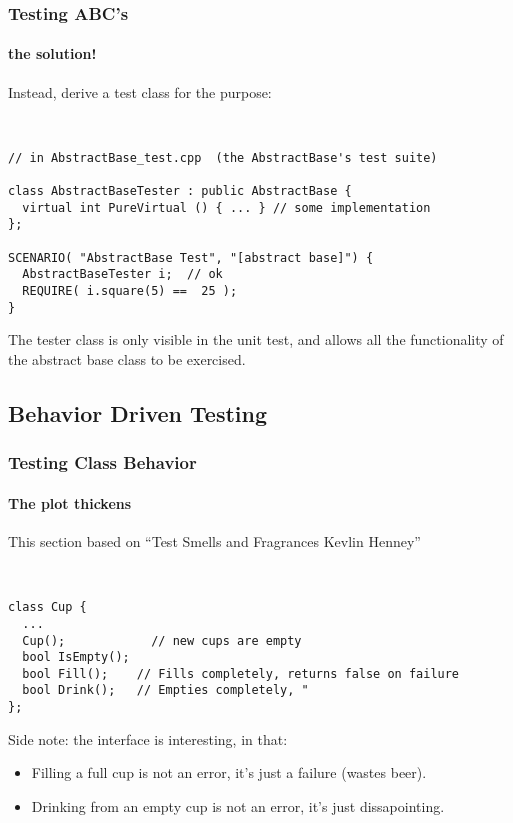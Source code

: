 \begin{frame}[fragile,t]
\frametitle{Testing ABC's}
\framesubtitle{the solution!}
Instead, derive a test class for the purpose:
{\scriptsize\
\begin{verbatim}
// in AbstractBase_test.cpp  (the AbstractBase's test suite)

class AbstractBaseTester : public AbstractBase {
  virtual int PureVirtual () { ... } // some implementation 
};

SCENARIO( "AbstractBase Test", "[abstract base]") {
  AbstractBaseTester i;  // ok
  REQUIRE( i.square(5) ==  25 );
}
\end{verbatim}}
The tester class is only visible in the unit test, and allows all the
functionality of the abstract base class to be exercised.

\end{frame}


\subsection{Behavior Driven Testing}
\begin{frame}[fragile,t]
\frametitle{Testing Class Behavior}
\framesubtitle{The plot thickens}
This section based on
``Test Smells and Fragrances Kevlin Henney'' 
{\scriptsize\
\begin{verbatim}
class Cup {
  ...
  Cup();            // new cups are empty
  bool IsEmpty(); 
  bool Fill();    // Fills completely, returns false on failure
  bool Drink();   // Empties completely, "
};

\end{verbatim}}

Side note: the interface is interesting, in that:
\begin{itemize}
  \item Filling a full cup is not an error, it's just a failure
    (wastes beer).
  \item Drinking from an empty cup is not an error, it's just
    dissapointing.
\end{itemize}


\end{frame}

